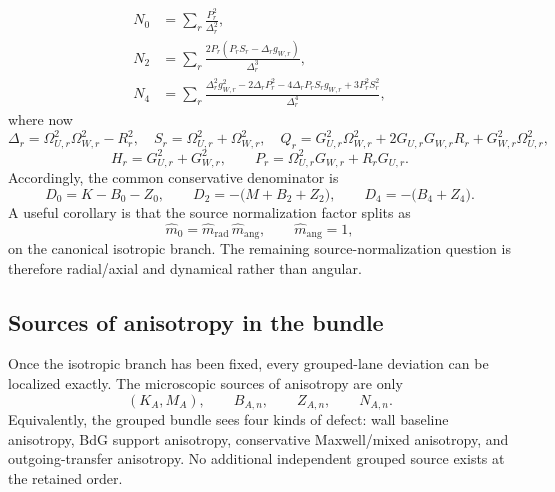 \documentclass[11pt]{article}
\theoremstyle{definition}
\begin{document}
\begin{equation}
\begin{split}
N_0&=\sum_r \frac{P_r^2}{\Delta_r^2},\\
N_2&=\sum_r \frac{2P_r(P_rS_r-\Delta_rg_{W,r})}{\Delta_r^3},\\
N_4&=\sum_r \frac{\Delta_r^2 g_{W,r}^2-2\Delta_rP_r^2-4\Delta_rP_rS_rg_{W,r}+3P_r^2S_r^2}{\Delta_r^4},
\end{split}
\label{eq:isotropic-N-moments}
\end{equation}
where now
\begin{equation}
\Delta_r=\Omega_{U,r}^2\Omega_{W,r}^2-R_r^2,
\quad
S_r=\Omega_{U,r}^2+\Omega_{W,r}^2,
\quad
Q_r=G_{U,r}^2\Omega_{W,r}^2+2G_{U,r}G_{W,r}R_r+G_{W,r}^2\Omega_{U,r}^2,
\label{eq:isotropic-DeltaSQR}
\end{equation}
\begin{equation}
H_r=G_{U,r}^2+G_{W,r}^2,
\qquad
P_r=\Omega_{U,r}^2G_{W,r}+R_rG_{U,r}.
\label{eq:isotropic-HP}
\end{equation}
Accordingly, the common conservative denominator is
\begin{equation}
D_0=K-B_0-Z_0,
\qquad
D_2=-\bigl(M+B_2+Z_2\bigr),
\qquad
D_4=-\bigl(B_4+Z_4\bigr).
\label{eq:isotropic-D-moments}
\end{equation}
A useful corollary is that the source normalization factor splits as
\begin{equation}
\hat m_0=\hat m_{\mathrm{rad}}\,\hat m_{\mathrm{ang}},
\qquad
\hat m_{\mathrm{ang}}=1,
\label{eq:isotropic-source-map-factorization}
\end{equation}
on the canonical isotropic branch. The remaining source-normalization question is therefore radial/axial and dynamical rather than angular.

\subsection{Sources of anisotropy in the bundle}

Once the isotropic branch has been fixed, every grouped-lane deviation can be localized exactly. The microscopic sources of anisotropy are only
\begin{equation}
(K_A,M_A),
\qquad
B_{A,n},
\qquad
Z_{A,n},
\qquad
N_{A,n}.
\label{eq:grouped-anisotropy-ledger}
\end{equation}
Equivalently, the grouped bundle sees four kinds of defect: wall baseline anisotropy, BdG support anisotropy, conservative Maxwell/mixed anisotropy, and outgoing-transfer anisotropy. No additional independent grouped source exists at the retained order.
\end{document}
